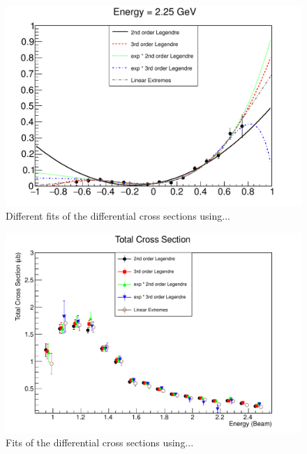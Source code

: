 \documentclass[prb,10pt,twocolumn,tightenlines,superscriptaddress]{revtex4-1}
\begin{document}
\begin{figure}[t]
    \centering
      \includegraphics[width=\linewidth]{CrossfitperE}
    \caption{Different fits of the differential cross sections using...}
        \label{fig:CrossfitperE}%
\end{figure}

\begin{figure}[t]
    \centering
      \includegraphics[width=\linewidth]{totcrossfits}
    \caption{Fits of the differential cross sections using...}
        \label{fig:totcrossfit}%
\end{figure}
\end{document}
